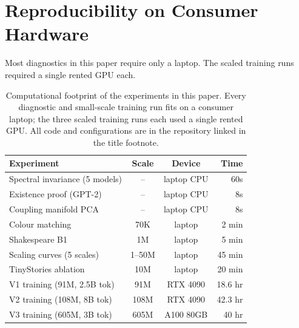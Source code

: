\documentclass[10pt,twocolumn]{article}
\begin{document}
\appendix

\section{Reproducibility on Consumer Hardware}
\label{app:repro}

Most diagnostics in this paper require only a laptop. The scaled training runs required a single rented GPU each.

\begin{table}[h]
\centering\small
\begin{tabular}{@{}p{3.5cm}ccr@{}}
\toprule
\textbf{Experiment} & \textbf{Scale} & \textbf{Device} & \textbf{Time} \\
\midrule
Spectral invariance (5 models) & -- & laptop CPU & 60s \\
Existence proof (GPT-2) & -- & laptop CPU & 8s \\
Coupling manifold PCA & -- & laptop CPU & 8s \\
Colour matching & 70K & laptop & 2 min \\
Shakespeare B1 & 1M & laptop & 5 min \\
Scaling curves (5 scales) & 1--50M & laptop & 45 min \\
TinyStories ablation & 10M & laptop & 20 min \\
\midrule
V1 training (91M, 2.5B tok) & 91M & RTX 4090 & 18.6 hr \\
V2 training (108M, 8B tok) & 108M & RTX 4090 & 42.3 hr \\
V3 training (605M, 3B tok) & 605M & A100 80GB & 40 hr \\
\bottomrule
\end{tabular}
\caption{Computational footprint of the experiments in this paper. Every diagnostic and small-scale training run fits on a consumer laptop; the three scaled training runs each used a single rented GPU. All code and configurations are in the repository linked in the title footnote.}
\label{tab:compute}
\end{table}
\end{document}
